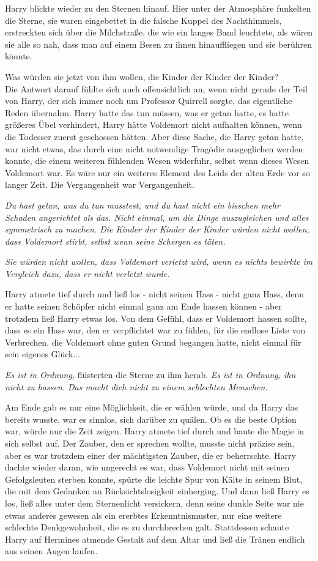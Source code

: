{Harry blickte wieder zu den Sternen hinauf. Hier unter der Atmosphäre funkelten die Sterne, sie waren eingebettet in die falsche Kuppel des Nachthimmels, erstreckten sich über die Milchstraße, die wie ein langes Band leuchtete, als wären sie alle so nah, dass man auf einem Besen zu ihnen hinauffliegen und sie berühren könnte.

Was würden sie jetzt von ihm wollen, die Kinder der Kinder der Kinder?\\ Die Antwort darauf fühlte sich auch offensichtlich an, wenn nicht gerade der Teil von Harry, der sich immer noch um Professor Quirrell sorgte, das eigentliche Reden übernahm. Harry hatte das tun müssen, was er getan hatte, es hatte größeres Übel verhindert, Harry hätte Voldemort nicht aufhalten können, wenn die Todesser zuerst geschossen hätten. Aber diese Sache, die Harry getan hatte, war nicht etwas, das durch eine nicht notwendige Tragödie ausgeglichen werden konnte, die einem weiteren fühlenden Wesen widerfuhr, selbst wenn dieses Wesen Voldemort war. Es wäre nur ein weiteres Element des Leids der alten Erde vor so langer Zeit. Die Vergangenheit war Vergangenheit.

\emph{Du hast getan, was du tun musstest, und du hast nicht ein bisschen mehr Schaden angerichtet als das. Nicht einmal, um die Dinge auszugleichen und alles symmetrisch zu machen. Die Kinder der Kinder der Kinder würden nicht wollen, dass Voldemort stirbt, selbst wenn seine Schergen es täten.}

\emph{Sie würden nicht wollen, dass Voldemort verletzt wird, wenn es nichts bewirkte im Vergleich dazu, dass er nicht verletzt wurde.}

Harry atmete tief durch und ließ los - nicht seinen Hass - nicht ganz Hass, denn er hatte seinen Schöpfer nicht einmal ganz am Ende hassen können - aber trotzdem ließ Harry etwas los. Von dem Gefühl, dass er Voldemort hassen sollte, dass es ein Hass war, den er verpflichtet war zu fühlen, für die endlose Liste von Verbrechen, die Voldemort ohne guten Grund begangen hatte, nicht einmal für sein eigenes Glück...

\emph{Es ist in Ordnung,} flüsterten die Sterne zu ihm herab. \emph{Es ist in Ordnung, ihn nicht zu hassen. Das macht dich nicht zu einem schlechten Menschen.}

Am Ende gab es nur eine Möglichkeit, die er wählen würde, und da Harry das bereits wusste, war es sinnlos, sich darüber zu quälen. Ob es die beste Option war, würde nur die Zeit zeigen. Harry atmete tief durch und baute die Magie in sich selbst auf. Der Zauber, den er sprechen wollte, musste nicht präzise sein, aber es war trotzdem einer der mächtigsten Zauber, die er beherrschte. Harry dachte wieder daran, wie ungerecht es war, dass Voldemort nicht mit seinen Gefolgsleuten sterben konnte, spürte die leichte Spur von Kälte in seinem Blut, die mit dem Gedanken an Rücksichtslosigkeit einherging. Und dann ließ Harry es los, ließ alles unter dem Sternenlicht versickern, denn seine dunkle Seite war nie etwas anderes gewesen als ein ererbtes Erkenntnismuster, nur eine weitere schlechte Denkgewohnheit, die es zu durchbrechen galt. Stattdessen schaute Harry auf Hermines atmende Gestalt auf dem Altar und ließ die Tränen endlich aus seinen Augen laufen.

}
